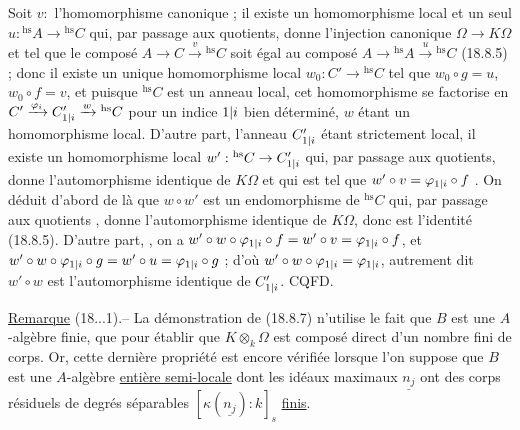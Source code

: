 Soit $v:$   l'homomorphisme canonique ; il existe  un homomorphisme local et un seul $u:{}^{\mathrm{hs}}A\to{}^{\mathrm{hs}}C$ qui, par passage aux quotients, donne l'injection canonique $\Omega\to K\Omega$  et tel que le composé $A\to C\xrightarrow{v}{}^{\mathrm{hs}}C$ soit égal au composé $A\to{}^{\mathrm{hs}}A\xrightarrow{u}{}^{\mathrm{hs}}C$ (18.8.5) ; donc il existe un unique homomorphisme local $w_0:C'\to{}^{\mathrm{hs}}C$ tel que $w_0\circ g=u$, $w_0\circ f=v$, et puisque ${}^{\mathrm{hs}}C$ est un anneau local, cet homomorphisme se factorise en $C'\xrightarrow{\varphi_i}C_{1|i}'\xrightarrow{w}{}^{\mathrm{hs}}C$ pour un indice $1|i$ bien déterminé, $w$ étant un homomorphisme local. D'autre part, l'anneau $C_{1|i}'$ étant strictement local, il existe un homomorphisme local $w':{}^{\mathrm{hs}}C\to C_{1|i}'$ qui, par passage aux quotients, donne l'automorphisme identique de $K\Omega$ et qui est tel que $w'\circ v=\varphi_{1|i}\circ f$ \deleted{\unsure{,}} . On déduit d'abord de là que $w\circ w'$ est un endomorphisme de ${}^{\mathrm{hs}}C$ qui, par passage aux quotients , donne l'automorphisme identique de $K\Omega$, donc est l'identité (18.8.5). D'autre part, , on a $w'\circ w\circ\varphi_{1|i}\circ f=w'\circ v=\varphi_{1|i}\circ f$, et $w'\circ w\circ\varphi_{1|i}\circ g=w'\circ u=\varphi_{1|i}\circ g$ ; d'où $w'\circ w\circ\varphi_{1|i}=\varphi_{1|i}$, autrement dit $w'\circ w$ est l'automorphisme identique de $C_{1|i}'$. CQFD.

\uline{Remarque} (18...1).-- La démonstration de (18.8.7) n'utilise le fait que $B$ est une $A$-algèbre finie, que pour établir que $K\otimes_k\Omega$ est composé direct d'un nombre fini de corps. Or, cette dernière propriété est encore vérifiée lorsque l'on suppose que $B$ est une $A$-algèbre \uline{entière semi-locale} dont les idéaux maximaux $\underline{n_j}$ ont des corps résiduels de degrés séparables $[\kappa(\underline{n_j}):k]_s$ \uline{finis}.

